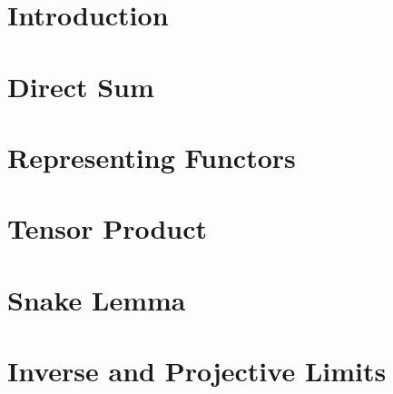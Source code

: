 \def\topic{Category Theory}



    \section{Introduction}
    \section{Direct Sum}
    \section{Representing Functors}
    \section{Tensor Product}
    \section{Snake Lemma}
    \section{Inverse and Projective Limits}



